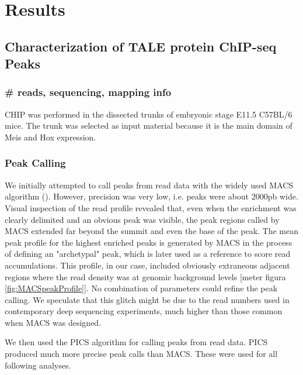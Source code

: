  \chapter{Results}
\label{chp:results}

\section{Characterization of TALE protein ChIP-seq Peaks}

\subsection{\# reads, sequencing, mapping info}
\ac{CHIP} was performed in the dissected trunks of embryonic stage E11.5 C57BL/6 mice. The trunk was selected as input material because it is the main domain of Meis and Hox expression.



\subsection{Peak Calling}

We initially attempted to call peaks from read data with the widely used \ac{MACS} algorithm (\cite{MACS ref}). However, precision was very low, i.e. peaks were about 2000pb wide. Visual inspection of the read profile revealed that, even when the enrichment was clearly delimited and an obvious peak was visible, the peak regions called by \ac{MACS} extended far beyond the summit and even the base of the peak. The mean peak profile for the highest enriched peaks is generated by \ac{MACS} in the process of defining an "archetypal" peak, which is later used as a reference to score read accumulations. This profile, in our case, included obviously extraneous adjacent regions where the read density was at genomic background levels [meter figura \ref{fig:MACSpeakProfile}]. No combination of parameters could refine the peak calling. We speculate that this glitch might be due to the read numbers used in contemporary deep sequencing experiments, much higher than those common when \ac{MACS} was designed.

We then used the \ac{PICS} algorithm \cite{ref} for calling peaks from read data. \ac{PICS} produced much more precise peak calls than \ac{MACS}. These were used for all following analyses.

